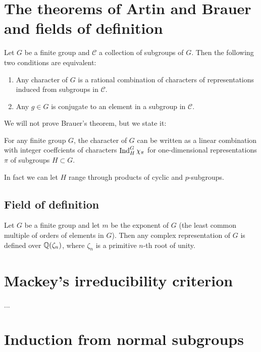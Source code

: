 \documentclass[11pt, english]{article}
\begin{document}
\newpage
\section{The theorems of Artin and Brauer and fields of definition}

\begin{thm}[Artin]

Let $G$ be a finite group and $\mathscr C$ a collection of subgroups of $G$. Then the following two conditions are equivalent:
\begin{enumerate}
\item Any character of $G$ is a rational combination of characters of representations induced from subgroups in $\mathscr C$.
\item Any $g \in G$ is conjugate to an element in a subgroup in $\mathscr C$.
\end{enumerate}
\end{thm}


We will not prove Brauer's theorem, but we state it:
\begin{thm}[Brauer]
  For any finite group $G$, the character of $G$ can be written as a linear combination with integer coeffcients of characters $\operatorname{Ind}_H^G \chi_\pi$ for one-dimensional representations $\pi$ of subgroups $H \subset G$.

In fact we can let $H$ range through products of cyclic and $p$-subgroups.
\end{thm}

\subsection{Field of definition}

\begin{thm}[Brauer]
Let $G$ be a finite group and let $m$ be the exponent of $G$ (the least common multiple of orders of elements in $G$). Then any complex representation of $G$ is defined over $\mathbb{Q}(\zeta_n)$, where $\zeta_n$ is a primitive $n$-th root of unity.
  
\end{thm}


\newpage
\section{Mackey's irreducibility criterion}

...

\newpage
\section{Induction from normal subgroups}
\end{document}
